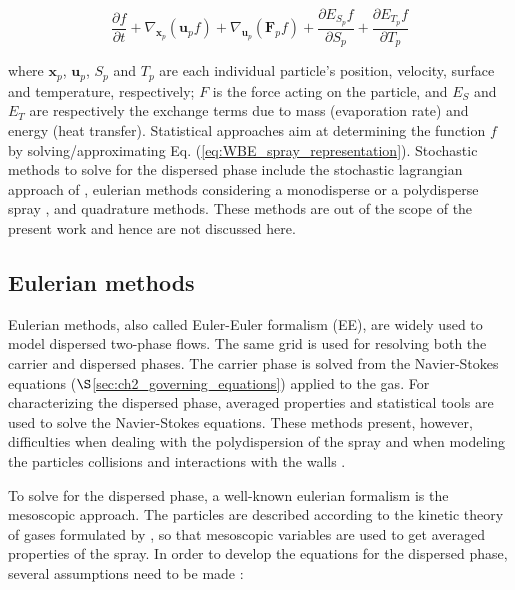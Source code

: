 \begin{equation}
\label{eq:WBE_spray_representation}
\frac{\partial f}{\partial t} + \nabla_{\textbf{x}_p} \left( \textbf{u}_p f \right) + \nabla_{\textbf{u}_p} \left( \textbf{F}_p f \right) + \frac{\partial E_{S_p} f}{\partial S_p} + \frac{\partial E_{T_p} f}{\partial T_p}
\end{equation}

where $\textbf{x}_p$, $\textbf{u}_p$, $S_p$ and $T_p$ are each individual particle's position, velocity, surface and temperature, respectively; $F$ is the force acting on the particle, and $E_S$ and $E_T$ are respectively the exchange terms due to mass (evaporation rate) and energy (heat transfer). Statistical approaches aim at determining the function $f$ by solving/approximating Eq. (\ref{eq:WBE_spray_representation}). Stochastic methods to solve for the dispersed phase include the stochastic lagrangian approach of , eulerian methods considering a monodisperse  or a polydisperse spray , and quadrature methods. These methods are out of the scope of the present work and hence are not discussed here.



\subsection{Eulerian methods}

Eulerian methods, also called Euler-Euler formalism (EE), are widely used to model dispersed two-phase flows. The same grid is used for resolving both the carrier and dispersed phases. The carrier phase is solved from the Navier-Stokes equations ($\S$\ref{sec:ch2_governing_equations}) applied to the gas. For characterizing the dispersed phase, averaged properties and statistical tools are used to solve the Navier-Stokes equations. These methods present, however, difficulties when dealing with the polydispersion of the spray and when modeling the particles collisions and interactions with the walls .

To solve for the dispersed phase, a well-known eulerian formalism is the mesoscopic approach. The particles are described according to the kinetic theory of gases formulated by , so that mesoscopic variables are used to get averaged properties of the spray. In order to develop the equations for the dispersed phase, several assumptions need to be made :

